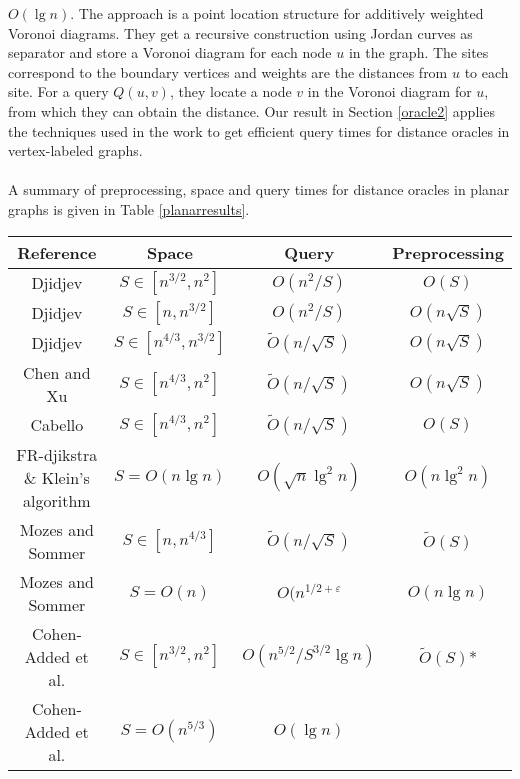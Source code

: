 $O(\lg n)$. The approach is a point location structure for additively weighted Voronoi
diagrams. They get a recursive construction using Jordan curves as separator and store a
Voronoi diagram for each node $u$ in the graph. The sites correspond to the boundary
vertices and weights are the distances from $u$ to each site. For a query $Q(u,v)$, they
locate a node $v$ in the Voronoi diagram for $u$, from which they can obtain the
distance. Our result in Section \ref{oracle2} applies the techniques used in the work to
get efficient query times for distance oracles in vertex-labeled graphs. \\
\\
A summary of preprocessing, space and query times for distance oracles in planar graphs is given in Table \ref{planarresults}.

\begin{table}[h!]
  \footnotesize
  \centering
  \begin{tabular}{c | c | c | c}
    Reference & Space & Query & Preprocessing \\
    \hline\hline
    Djidjev \cite{djidjev1996efficient} & $S\in [n^{3/2}, n^2]$ & $O(n^2/S)$ & $O(S)$ \\
    \hline
    Djidjev \cite{djidjev1996efficient} & $S\in [n, n^{3/2}]$ & $O(n^2/S)$ & $O(n\sqrt{S})$ \\
    \hline
    Djidjev \cite{djidjev1996efficient} & $S\in [n^{4/3}, n^{3/2}]$ &
    $\tilde{O}(n/\sqrt{S})$ & $O(n\sqrt{S})$ \\
    \hline
    Chen and Xu \cite{chen2000shortest} & $S\in [n^{4/3}, n^2]$ & $\tilde{O}(n/\sqrt{S})$
    & $O(n\sqrt{S})$ \\
    \hline
    Cabello \cite{cabello2006many} & $S\in [n^{4/3}, n^2]$ & $\tilde{O}(n/\sqrt{S})$ &
    $O(S)$ \\
    \hline
    FR-djikstra \& Klein's algorithm \cite{klein2005multiple}\cite{fakcharoenphol2006planar}& $S = O(n\lg n)$ &
    $O(\sqrt{n}\lg^2 n)$ & $O(n\lg^2 n)$ \\
    \hline
    Mozes and Sommer \cite{mozes2012exact} & $S\in [n, n^{4/3}]$ &
    $\tilde{O}(n/\sqrt{S})$ & $\tilde{O}(S)$ \\
    \hline
    Mozes and Sommer \cite{mozes2012exact} & $S=O(n)$ & $O(n^{1/2+\varepsilon}$ & $O(n\lg
    n)$ \\
    \hline
    Cohen-Added et al. \cite{cohen2017fast} & $S\in [n^{3/2}, n^2]$ &
    $O(n^{5/2}/S^{3/2}\lg n)$ & $\tilde{O}(S)$* \\
    \hline
    Cohen-Added et al. \cite{cohen2017fast} & $S=O(n^{5/3})$ & $O(\lg n)$ &

\end{tabular}
\end{table}

